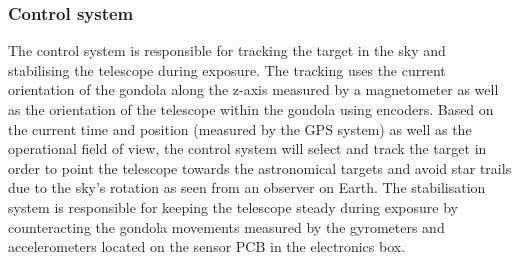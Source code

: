 \subsubsection{Control system}
The control system is responsible for tracking the target in the sky and stabilising the telescope during exposure. The tracking uses the current orientation of the gondola along the z-axis measured by a magnetometer as well as the orientation of the telescope within the gondola using encoders. Based on the current time and position (measured by the GPS system) as well as the operational field of view, the control system will select and track the target in order to point the telescope towards the astronomical targets and avoid star trails due to the sky's rotation as seen from an observer on Earth. The stabilisation system is responsible for keeping the telescope steady during exposure by counteracting the gondola movements measured by the gyrometers and accelerometers located on the sensor PCB in the electronics box.




















































\raggedbottom
